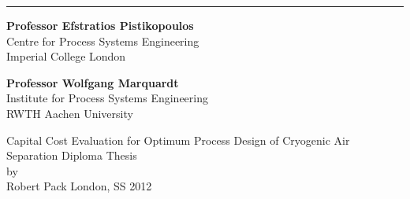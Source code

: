 
\vspace*{-2.0cm} \thispagestyle{empty}
\begin{minipage}[b]{17cm}
\begin{minipage}[b]{8.5cm}
\end{minipage}
\hfill
\begin{minipage}[b]{6.95cm}
	\begin{flushright}
	\end{flushright}
\end{minipage}
\end{minipage}
\rule{\textwidth}{0.5pt}

\begin{minipage}[b]{8.5cm}
	\begin{flushleft}
		\textcolor{CPSEBlue}{
		\textbf{Professor Efstratios Pistikopoulos} \\ Centre for Process Systems Engineering \\ Imperial College London}
	\end{flushleft}
\end{minipage}
\begin{minipage}[b]{8.3cm}
	\begin{flushright}
		\textcolor{AVTDarkBlue}{
		\textbf{Professor Wolfgang Marquardt} \\ Institute for Process Systems Engineering \\ RWTH Aachen University}
	\end{flushright}
\end{minipage}




\begin{center}
	\vspace{3cm}
	 \Huge  Capital Cost Evaluation for Optimum Process Design of Cryogenic Air Separation
	\vspace{1cm}
	 \vfill \LARGE
	{Diploma Thesis\\
	by\\
	Robert Pack} \vfill{London, SS 2012}
\end{center}

